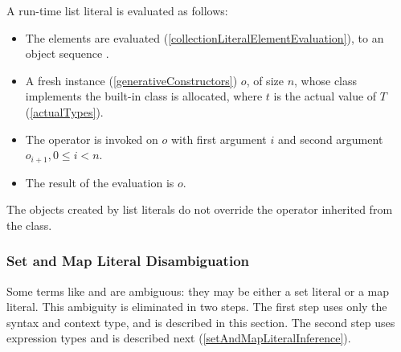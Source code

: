 \documentclass[makeidx]{article}
\begin{document}
{

\LMHash{}%
A run-time list literal
is evaluated as follows:
\begin{itemize}
\item
  The elements  are evaluated
  (\ref{collectionLiteralElementEvaluation}),
  to an object sequence .
\item
  A fresh instance (\ref{generativeConstructors}) $o$, of size $n$,
  whose class implements the built-in class 
  is allocated,
  where $t$ is the actual value of $T$
  (\ref{actualTypes}).
\item
  The operator \lit{[]=} is invoked on $o$ with
  first argument $i$ and second argument
  $o_{i+1}, 0 \le i < n$.
\item
  The result of the evaluation is $o$.
\end{itemize}

\LMHash{}%
The objects created by list literals do not override
the \lit{==} operator inherited from the  class.



\subsubsection{Set and Map Literal Disambiguation}

\LMHash{}%
Some terms like \code{\{\}} and  are ambiguous:
they may be either a set literal or a map literal.
This ambiguity is eliminated in two steps.
The first step uses only the syntax and context type,
and is described in this section.
The second step uses expression types and is described next
(\ref{setAndMapLiteralInference}).

}
\end{document}
